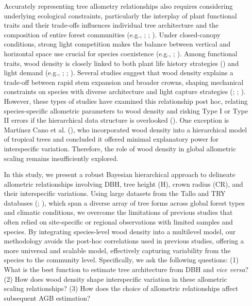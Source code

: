 \documentclass[
  12pt,
  letterpaper,
  DIV=11,
  numbers=noendperiod]{scrartcl}
\begin{document}
Accurately representing tree allometry relationships also requires
considering underlying ecological constraints, particularly the
interplay of plant functional traits and their trade-offs influences
individual tree architecture and the composition of entire forest
communities (e.g., ;
;
). Under closed-canopy
conditions, strong light competition makes the balance between vertical
and horizontal space use crucial for species coexistence (e.g.,
;
). Among functional traits,
wood density is closely linked to both plant life history strategies
() and light demand
(e.g., ;
;
). Several studies
suggest that wood density explains a trade-off between rapid stem
expansion and broader crowns, shaping mechanical constraints on species
with diverse architecture and light capture strategies
(;
; ). However, these types of studies have examined this
relationship post hoc, relating species-specific allometric parameters
to wood density and risking Type I or Type II errors if the hierarchical
data structure is overlooked (). One exception is Martínez Cano et al.
(), who incorporated wood density
into a hierarchical model of tropical trees and concluded it offered
minimal explanatory power for interspecific variation. Therefore, the
role of wood density in global allometric scaling remains insufficiently
explored.

In this study, we present a robust Bayesian hierarchical approach to
delineate allometric relationships involving DBH, tree height (H), crown
radius (CR), and their interspecific variations. Using large datasets
from the Tallo and TRY databases (; ), which span a
diverse array of tree forms across global forest types and climatic
conditions, we overcome the limitations of previous studies that often
relied on site-specific or regional observations with limited samples
and species. By integrating species-level wood density into a multilevel
model, our methodology avoids the post-hoc correlations used in previous
studies, offering a more universal and scalable model, effectively
capturing variability from the species to the community level.
Specifically, we ask the following questions: (1) What is the best
function to estimate tree architecture from DBH and \emph{vice versa}?
(2) How does wood density shape interspecific variation in these
allometric scaling relationships? (3) How does the choice of allometric
relationships affect subsequent AGB estimation?
\end{document}
